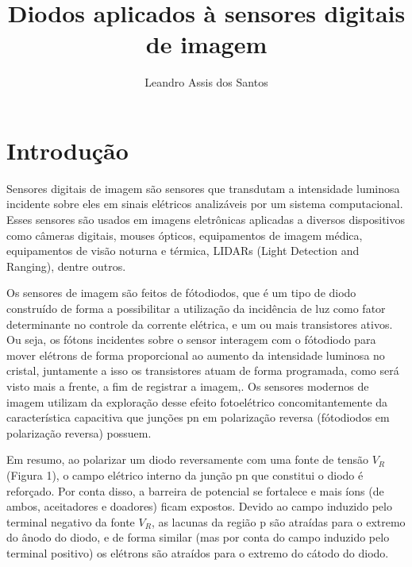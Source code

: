 \documentclass[11pt,a4paper,twocolumn]{article}
\title{\textbf{Diodos aplicados à sensores digitais de imagem}}
\author{Leandro Assis dos Santos}
\begin{document}
\maketitle

\section*{Introdução}
		Sensores digitais de imagem são sensores que transdutam a intensidade luminosa incidente sobre eles em sinais elétricos analizáveis por um sistema computacional. Esses sensores são usados em imagens eletrônicas aplicadas a diversos dispositivos como câmeras digitais, mouses ópticos, equipamentos de imagem médica, equipamentos de visão noturna e térmica, LIDARs (Light Detection and Ranging), dentre outros.
				
		Os sensores de imagem são feitos de fótodiodos, que é um tipo de diodo construído de forma a possibilitar a utilização da incidência de luz como fator determinante no controle da corrente elétrica, e um ou mais transistores ativos. Ou seja, os fótons incidentes sobre o sensor interagem com o fótodiodo para mover elétrons de forma proporcional ao aumento da intensidade luminosa no cristal, juntamente a isso os transistores atuam de forma programada, como será visto mais a frente, a fim de registrar a imagem,. Os sensores modernos de imagem utilizam da exploração desse efeito fotoelétrico concomitantemente da característica capacitiva que junções pn em polarização reversa (fótodiodos em polarização reversa) possuem. 
		
		Em resumo, ao polarizar um diodo reversamente com uma fonte de tensão $V_{R}$ (Figura 1), o campo elétrico interno da junção pn que constitui o diodo é reforçado. Por conta disso, a barreira de potencial se fortalece e mais íons (de ambos, aceitadores e doadores) ficam expostos. Devido ao campo induzido pelo terminal negativo da fonte $V_{R}$, as lacunas da região p são atraídas para o extremo do ânodo do diodo, e de forma similar (mas por conta do campo induzido pelo terminal positivo) os elétrons são atraídos para o extremo do cátodo do diodo.
		
\end{document}
